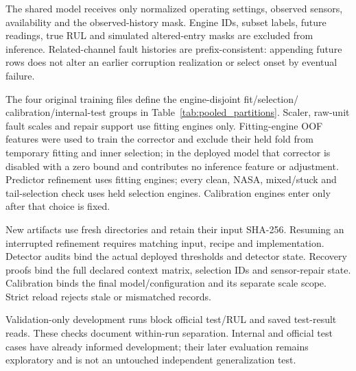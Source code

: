 The shared model receives only normalized operating settings, observed sensors,
availability and the observed-history mask. Engine IDs, subset labels, future
readings, true RUL and simulated altered-entry masks are excluded from inference.
Related-channel fault histories are prefix-consistent: appending future rows does
not alter an earlier corruption realization or select onset by eventual failure.

The four original training files define the engine-disjoint fit/selection/
calibration/internal-test groups in Table~\ref{tab:pooled_partitions}. Scaler,
raw-unit fault scales and repair support use fitting engines only. Fitting-engine
OOF features were used to train the corrector and exclude their held fold
from temporary fitting and inner selection; in the deployed model that corrector is
disabled with a zero bound and contributes no inference feature or adjustment.
Predictor refinement uses fitting engines; every clean, NASA, mixed/stuck
and tail-selection check uses held selection engines. Calibration engines enter
only after that choice is fixed.

New artifacts use fresh directories and retain their input SHA-256. Resuming an
interrupted refinement requires matching input, recipe and implementation.
Detector audits bind the actual deployed thresholds and detector state.
Recovery proofs bind the full declared context matrix, selection IDs and sensor-repair
state. Calibration binds the final model/configuration and its separate scale
scope. Strict reload rejects stale or mismatched records.

Validation-only development runs block official test/RUL and saved test-result
reads. These checks document within-run separation. Internal and official test
cases have already informed development; their later evaluation
remains exploratory and is not an untouched independent generalization test.
